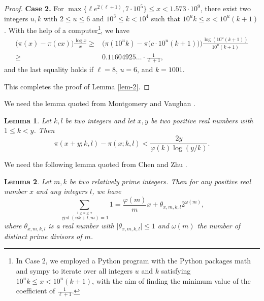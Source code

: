 \documentclass[12pt,a4paper,reqno]{amsart}
\numberwithin{equation}{section}
\theoremstyle{plain}
\newtheorem{lemma}{Lemma}
\theoremstyle{definition}
\begin{document}
\begin{proof}
 	\textbf{Case 2.} For $\max\{\ell e^{2(\ell+1)},7\cdot 10^{5}\}\leq x< 1.573\cdot 10^{9}$, there exist two integers $u,k$ with
 	$2\le u\le 6$ and  $10^3\le k<10^4$ such that $10^uk\le
 	x<10^u(k+1)$. With the help of a computer\footnote{In Case 2, we employed a Python program with the Python packages math and sympy to iterate over all integers $u$ and $k$ satisfying $10^{u}k\leq x<10^{u}(k+1)$, with the aim of finding the minimum value of the coefficient of $\frac{1}{\ell+1}$.}, we have
 	\begin{align*}
 		\big(\pi(x)-\pi(cx)\big)\frac{\log x}{x}
 		\geq &\Big( \pi(10^{u}k)-\pi \big(c \cdot 10^{u}(k+1) \big) \Big)\frac{\log \left( 10^{u}(k+1) \right)}{10^{u}(k+1)}\\
 		\geq &0.11604925\ldots \cdot \frac{1}{\ell+1},
 	\end{align*}
 	and the last equality holds if $\ell=8$, $u=6$, and $k=1001$.
 	
 	This completes the proof of Lemma \ref{lem-2}.
 \end{proof}
 
  We need the lemma quoted from Montgomery and Vaughan \cite[Theorem 2]{Montgomery/Vaughan}. 
 \begin{lemma} \label{lem-3}
 	Let $k,l$ be two integers and let $x,y$ be two positive real numbers
 	with $1\le k<y$. Then
 	$$\pi (x+y; k,l)-\pi (x; k,l)<\frac{2y}{\varphi (k) \log (y/k)}.$$
 \end{lemma}
 
   We need the following lemma quoted from Chen and Zhu \cite[Lemma 2.8]{Chen/Zhu}.
 \begin{lemma}\label{lem-4}
 	Let $m,k$ be two relatively prime integers. Then for any positive real number $x$ and any integers $l$, we have
 	\begin{equation*}
 		\sum_{\stackrel{1\leq n\leq x}{\gcd(nk+l,m)=1}}1=\frac{\varphi(m)}{m}x+\theta_{x,m,k,l} 2^{\omega(m)},
 	\end{equation*}  
 	where $\theta_{x,m,k,l}$ is a real number with $\lvert \theta_{x,m,k,l}\rvert \leq 1$ and $\omega(m)$ the number of distinct prime divisors of $m$.
 \end{lemma}
 
\end{document}
